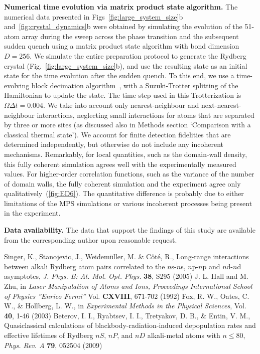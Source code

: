 \documentclass[prl,nobalancelastpage,twocolumn,superscriptaddress,nofootinbib]{revtex4}
\begin{document}
\begin{footnotesize}
\noindent
\textbf{Numerical time evolution via matrix product state algorithm.}
The numerical data presented in Figs~\ref{fig:large_system_size}b
and~\ref{fig:crystal_dynamics}b were obtained by simulating the evolution of
the 51-atom array during the sweep across the phase transition and the
subsequent sudden quench using a matrix product state algorithm with bond
dimension $D=256$. We simulate the entire preparation protocol to generate the
Rydberg crystal (Fig.~\ref{fig:large_system_size}b), and use the resulting
state as an initial state for the time evolution after the sudden quench. To
this end, we use a time-evolving block decimation
algorithm~\cite{Vidal2004,Daley2004}, with a Suzuki-Trotter splitting of the
Hamiltonian to update the state. The time step used in this Trotterization is
$\Omega \Delta t=0.004$. We take into account only nearest-neighbour and
next-nearest-neighbour interactions, neglecting small interactions for atoms
that are separated by three or more sites (as discussed also in Methods section
`Comparison with a classical thermal state'). We account for finite detection
fidelities that are determined independently, but otherwise do not include any
incoherent mechanisms.  Remarkably, for local quantities, such as the
domain-wall density, this fully coherent simulation agrees well with the
experimentally measured values. For higher-order correlation functions, such as
the variance of the number of domain walls, the fully coherent simulation and
the experiment agree only qualitatively~(\ref{fig:ED6}). The quantitative
difference is probably due to either limitations of the MPS simulations or
various incoherent processes being present in the experiment.

\FloatBarrier
\textbf{Data availability.} The data that support the findings of this study
are available from the corresponding author upon reasonable request.
\renewcommand{\addcontentsline}[3]{}


\begin{thebibliography}{}
     Singer, K., Stanojevic, J., Weidem\"uller, M. \& C\^{o}t\'e, R., Long-range interactions between alkali Rydberg atom pairs correlated to the $n$s-$n$s, $n$p-$n$p and $n$d-$n$d asymptotes, \emph{J. Phys. B: At. Mol. Opt. Phys.} \textbf{38}, S295 (2005)
 J. L. Hall and M. Zhu, in \emph{Laser Manipulation of Atoms and Ions, Proceedings International School of Physics ”Enrico Fermi”} Vol. \textbf{CXVIII}, 671-702 (1992) 
 Fox, R. W., Oates, C. W., \& Hollberg, L. W., in \emph{Experimental Methods in the Physical Sciences}, Vol. \textbf{40}, 1-46 (2003)
 Beterov, I. I., Ryabtsev, I. I., Tretyakov, D. B., \& Entin, V. M., Quasiclassical calculations of blackbody-radiation-induced depopulation rates and effective lifetimes of Rydberg $nS$, $nP$, and $nD$ alkali-metal atoms with $n\leq80$, \emph{Phys. Rev. A} \textbf{79}, 052504 (2009)


\end{thebibliography}
\end{footnotesize}
\end{document}
